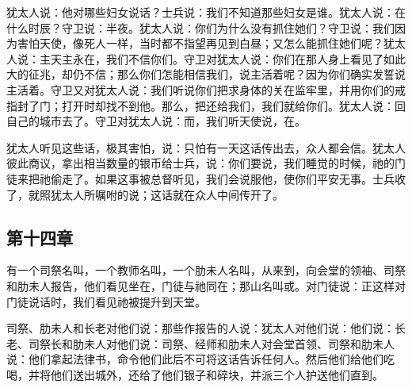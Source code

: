 犹太人说：他对哪些妇女说话？士兵说：我们不知道那些妇女是谁。犹太人说：在什么时辰？守卫说：半夜。犹太人说：你们为什么没有抓住她们？守卫说：我们因为害怕天使，像死人一样，当时都不指望再见到白昼；又怎么能抓住她们呢？犹太人说：主天主永在，我们不信你们。守卫对犹太人说：你们在那人身上看见了如此大的征兆，却仍不信；那么你们怎能相信我们，说主活着呢？因为你们确实发誓说主活着。守卫又对犹太人说：我们听说你们把求身体的关在监牢里，并用你们的戒指封了门；打开时却找不到他。那么，把还给我们，我们就给你们。犹太人说：回自己的城市去了。守卫对犹太人说：而，我们听天使说，在。\par

犹太人听见这些话，极其害怕，说：只怕有一天这话传出去，众人都会信。犹太人彼此商议，拿出相当数量的银币给士兵，说：你们要说，我们睡觉的时候，祂的门徒来把祂偷走了。如果这事被总督听见，我们会说服他，使你们平安无事。士兵收了，就照犹太人所嘱咐的说；这话就在众人中间传开了。\par


\subsection{第十四章}

有一个司祭名叫，一个教师名叫，一个肋未人名叫，从来到，向会堂的领袖、司祭和肋未人报告，他们看见坐在，门徒与祂同在；那山名叫或。对门徒说：正这样对门徒说话时，我们看见祂被提升到天堂。\par

司祭、肋未人和长老对他们说：那些作报告的人说：犹太人对他们说：他们说：长老、司祭长和肋未人对他们说：司祭、经师和肋未人对会堂首领、司祭和肋未人说：他们拿起法律书，命令他们此后不可将这话告诉任何人。然后他们给他们吃喝，并将他们送出城外，还给了他们银子和碎块，并派三个人护送他们直到。\par

